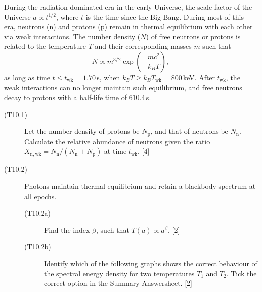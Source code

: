 During the radiation dominated era in the early Universe, the scale factor of
the Universe $a \propto t^{1/2}$, where $t$ is the time since the Big Bang.
During most of this era, neutrons (n) and protons (p) remain in thermal
equilibrium with each other via weak interactions. The number density ($N$) of
free neutrons or protons is related to the temperature $T$ and their
corresponding masses $m$ such that
\[ N \propto m^{3/2}\exp\left(-\frac{mc^2}{k_B T}\right), \]
as long as time $t \leq t_{\mathrm{wk}} = 1.70$\,s, when
$k_B T \geq k_B T_{\mathrm{wk}} = 800$\,keV. After $t_{\mathrm{wk}}$, the weak
interactions can no longer maintain such equilibrium, and free neutrons decay
to protons with a half-life time of $610.4$\,s.

\begin{description}
\item[(T10.1)] Let the number density of protons be $N_{\mathrm{p}}$, and that
  of neutrons be $N_{\mathrm{n}}$. Calculate the relative abundance of
  neutrons given the ratio
  $X_{\mathrm{n,wk}} = N_{\mathrm{n}}/(N_{\mathrm{n}} + N_{\mathrm{p}})$ at
  time $t_{\mathrm{wk}}$. \hfill[4]
\item[(T10.2)] Photons maintain thermal equilibrium and retain a blackbody
  spectrum at all epochs.
  \begin{description}
  \item[(T10.2a)] Find the index $\beta$, such that $T(a) \propto a^\beta$.
    \hfill[2]
  \item[(T10.2b)] Identify which of the following graphs shows the correct
    behaviour of the spectral energy density for two temperatures $T_1$ and
    $T_2$. Tick the correct option in the Summary Answersheet. \hfill[2]
  \end{description}



\end{description}
